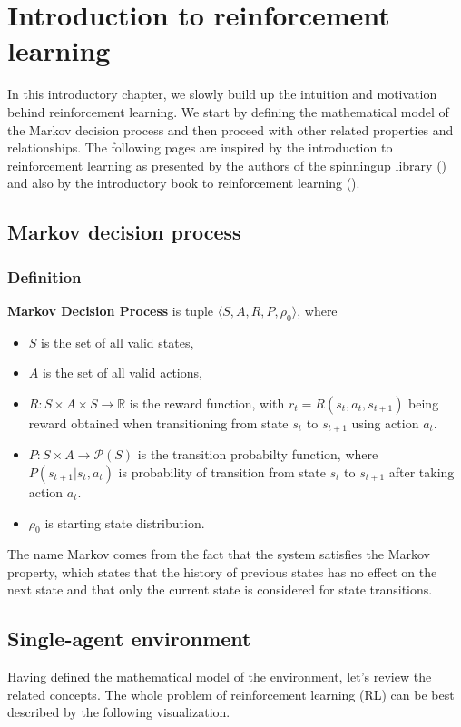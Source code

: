 \chapter{Introduction to reinforcement learning}

In this introductory chapter, we slowly build up the intuition and motivation behind reinforcement learning.
We start by defining the mathematical model of the Markov decision process and then proceed with other related properties and relationships.
The following pages are inspired by the introduction to reinforcement learning as presented by the authors of the spinningup library (\cite{SpinningUpIntro}) and also by the introductory book to reinforcement learning (\cite{sutton2018reinforcement}).

\section{Markov decision process}
\subsection*{Definition}

\label{MDP} \textbf{Markov Decision Process} is tuple $\langle S, A, R, P, \rho_0\rangle$, where
\begin{itemize}
    \item $S$ is the set of all valid states,
    \item $A$ is the set of all valid actions,
    \item $R: S \times A \times S \rightarrow \mathbb{R}$ is the reward function, with $r_t=R(s_t, a_t,s_{t+1})$ being reward obtained when transitioning from state $s_t$ to $s_{t+1}$ using action $a_t$.
    \item $P: S \times A \rightarrow \mathcal{P}(S)$ is the transition probabilty function, where $P(s_{t+1}|s_t, a_t)$ is probability of transition from state $s_t$ to $s_{t+1}$ after taking action $a_t$. 
    \item $\rho_0$ is starting state distribution.
\end{itemize}
The name Markov comes from the fact that the system satisfies the Markov property, which states that the history of previous states has no effect on the next state and that only the current state is considered for state transitions.

\section{Single-agent environment}
Having defined the mathematical model of the environment, let's review the related concepts.
The whole problem of reinforcement learning (RL) can be best described by the following visualization.

